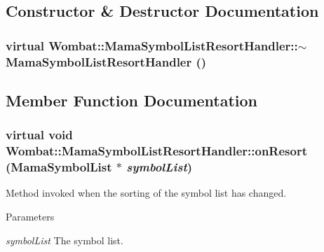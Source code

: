 \subsection{Constructor \& Destructor Documentation}
\hypertarget{classWombat_1_1MamaSymbolListResortHandler_a37e96989dd679b574b05f081724a5e72}{
\subsubsection[{$\sim$MamaSymbolListResortHandler}]{\setlength{\rightskip}{0pt plus 5cm}virtual Wombat::MamaSymbolListResortHandler::$\sim$MamaSymbolListResortHandler ()}}
\label{classWombat_1_1MamaSymbolListResortHandler_a37e96989dd679b574b05f081724a5e72}


\subsection{Member Function Documentation}
\hypertarget{classWombat_1_1MamaSymbolListResortHandler_a952799ee3cd5653756ea395eea3a387c}{
\subsubsection[{onResort}]{\setlength{\rightskip}{0pt plus 5cm}virtual void Wombat::MamaSymbolListResortHandler::onResort ({\bf MamaSymbolList} $\ast$ {\em symbolList})}}
\label{classWombat_1_1MamaSymbolListResortHandler_a952799ee3cd5653756ea395eea3a387c}


Method invoked when the sorting of the symbol list has changed. 
\begin{DoxyParams}{Parameters}
\item[{\em symbolList}]The symbol list. \end{DoxyParams}
